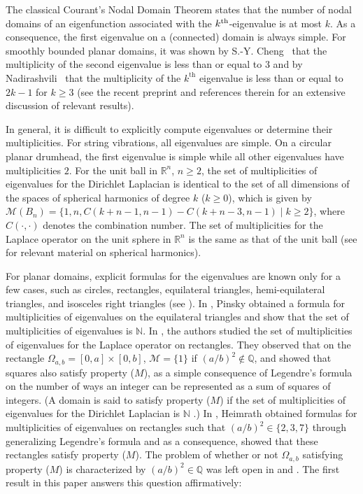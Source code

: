 \documentclass[11pt]{amsart}
\theoremstyle{definition}
\def\sm{{\mathcal M}}
\def\N{{\mathbb N}}
\def\Q{{\mathbb Q}}
\def\R{{\mathbb R}}
\begin{document}
The classical Courant's Nodal Domain Theorem states that the number of nodal domains of an eigenfunction associated with the $k^{\rm th}$-eigenvalue  is at most $k$.  As a consequence, the first eigenvalue on a (connected) domain is always simple. For smoothly bounded planar domains, it was shown by S.-Y. Cheng~\cite{Cheng} that the multiplicity of the second eigenvalue is less than or equal to $3$ and by Nadirashvili~\cite{Nad} that the multiplicity of the $k^{\text{th}}$ eigenvalue is less than or equal to $2k-1$ for $k\ge 3$ (see the recent preprint \cite{BerardHelffer} and references therein for an extensive discussion of relevant results). 

In general, it is difficult to explicitly compute eigenvalues or determine their multiplicities. For string vibrations, all eigenvalues are simple. On a circular planar drumhead, the first eigenvalue is simple while all other eigenvalues have multiplicities $2$. For the unit ball in $\R^n$, $n\ge 2$, the set of multiplicities of eigenvalues for the Dirichlet Laplacian is identical to the set of all dimensions of the spaces of spherical harmonics of degree $k$ ($k\ge 0$), which is given by $\sm(B_n)=\{1, n, C(k+n-1, n-1)-C(k+n-3, n-1) \mid k\ge 2\}$, where $C(\cdot, \cdot)$ denotes the combination number. The set of multiplicities for the Laplace operator on the unit sphere in $\R^n$ is the same as that of the unit ball (see \cite[Chapter IV]{SW} for relevant material on spherical harmonics).

For planar domains,  explicit formulas for the eigenvalues are known only for a few cases, such as circles, rectangles, equilateral triangles, hemi-equilateral triangles, and isosceles right triangles (see \cite{McCartin}).  In \cite{Pinsky}, Pinsky obtained a formula for multiplicities of eigenvalues on the equilateral triangles and show that the set of multiplicities of eigenvalues is $\mathbb{N}$. In \cite{Fu2025-ph},  the authors studied the set of multiplicities of eigenvalues for the Laplace operator on rectangles. They observed that on the rectangle $\Omega_{a, b}=[0,a]\times[0,b]$, $\sm=\{1\}$ if $(a/b)^2\notin\mathbb{Q}$, and showed that squares also satisfy property ($M$),  as a simple consequence of Legendre's formula on the number of ways an integer can be represented as a sum of squares of integers. (A domain is said to satisfy property ($M$) if the set of multiplicities of eigenvalues for the Dirichlet Laplacian is $\N$ \cite{Fu2025-ph}.)  In \cite{Heimrath}, Heimrath obtained formulas for multiplicities of eigenvalues on rectangles such that $(a/b)^2\in \{2, 3, 7\}$ through  generalizing Legendre's formula and as a consequence, showed that these rectangles satisfy property ($M$). The problem of whether or not $\Omega_{a, b}$ satisfying property ($M$) is characterized by $(a/b)^2\in\Q$ was left open in \cite{Fu2025-ph} and \cite{Heimrath}. The first result in this paper answers this question affirmatively:
\end{document}
